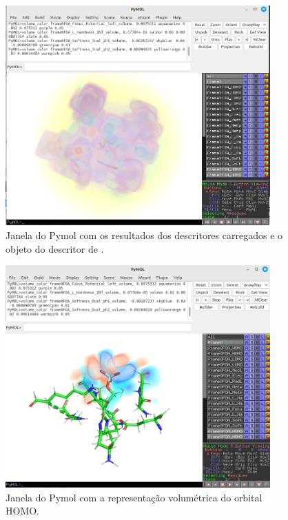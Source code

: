 \documentclass[a4paper,11pt]{refart}
\begin{document}
	 \hspace*{-\leftmarginwidth}
	 \begin{minipage}{\fullwidth}
	 	\begin{figure}[H]
	 		\begin{center}
	 			\includegraphics[width=4in]{frame0_descritores}
	 			\caption{Janela do Pymol com os resultados dos descritores carregados e o objeto do descritor de .}
	 			\label{fig_tut6_6}
	 		\end{center}
	 	\end{figure}
	 \end{minipage}
 
     \hspace*{-\leftmarginwidth}
     \begin{minipage}{\fullwidth}
     	\begin{figure}[H]
     		\begin{center}
     			\includegraphics[width=4in]{frame0_homo}
     			\caption{Janela do Pymol com a representação volumétrica do orbital HOMO.}
     			\label{fig_homo}
     		\end{center}
     	\end{figure}
     \end{minipage}
	 
\end{document}

